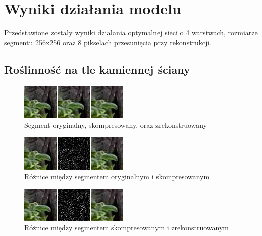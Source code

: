 \documentclass[a4paper, 12pt]{article}
\begin{document}
\section{Wyniki działania modelu}
Przedstawione zostały wyniki działania optymalnej sieci o 4 warstwach,
rozmiarze segmentu 256x256 oraz 8 pikselach przesunięcia przy rekonstrukcji.
\subsection{Roślinność na tle kamiennej ściany}
\begin{figure}[h!]
\begin{center}
	\includegraphics[width=0.85\columnwidth]{compare_sample.png}
	\caption{Segment oryginalny, skompresowany, oraz zrekonstruowany}
\end{center}
\end{figure}
\begin{figure}[h!]
\begin{center}
	\includegraphics[width=0.85\columnwidth]{orig_vs_comp.png}
	\caption{Różnice między segmentem oryginalnym i skompresowanym}
\end{center}
\end{figure}
\begin{figure}[h!]
\begin{center}
	\includegraphics[width=0.85\columnwidth]{comp_vs_rest.png}
	\caption{Różnice między segmentem skompresowanym i zrekonstruowanym}
\end{center}
\end{figure}
\end{document}
